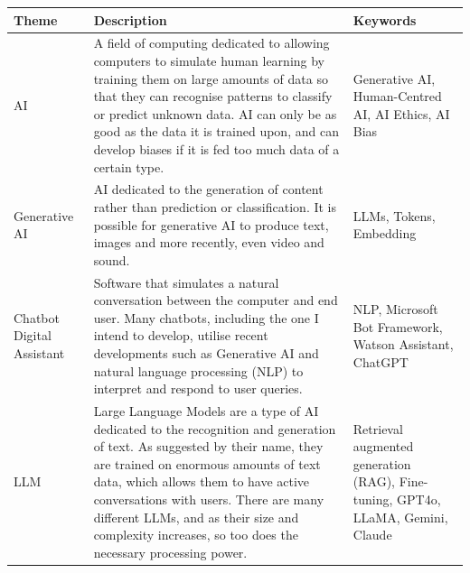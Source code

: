 \documentclass[12pt]{report}
\begin{document}
    \begin{table}[H]
        \centering
        \begin{tabular}{|p{}|p{} | p{}|}
            \hline
            \cellcolor{blue!25}Theme & \cellcolor{blue!25}Description &
            \cellcolor{blue!25}Keywords \\

            \hline

            AI & A field of computing dedicated to allowing computers to simulate human
            learning by training them on large amounts of data so that they can recognise patterns to classify or 
            predict unknown data. AI can only be as good as the data it is trained upon, and can 
            develop biases if it is fed too much data of a certain type. & Generative AI, Human-Centred AI, AI Ethics, AI Bias \\

            \hline

            Generative AI & AI dedicated to the generation of content rather than prediction or 
            classification. It is possible for generative AI to produce text, images and 
            more recently, even video and sound. & LLMs, Tokens, Embedding \\

            \hline
            Chatbot \newline Digital Assistant & Software that simulates a natural conversation between the 
            computer and end user. Many chatbots, including the one I intend to develop, utilise recent
            developments such as Generative AI and natural language processing (NLP) to interpret and respond to user queries.
            \autocite{IBMChatbotDef}
            & NLP, 
            Microsoft Bot Framework, Watson Assistant, ChatGPT \\

            \hline 

            LLM & Large Language Models are a type of AI dedicated to the recognition and generation of text.
            As suggested by their name, they are trained on enormous amounts of text data, which allows them 
            to have active conversations with users. There are many different LLMs, and as their size and 
            complexity increases, so too does the necessary processing power. &
            Retrieval augmented generation (RAG), Fine-tuning, GPT4o, LLaMA, Gemini, Claude

            \\


\end{tabular}
\end{table}
\end{document}
